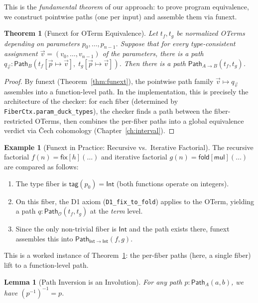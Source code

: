 \documentclass[11pt,a4paper]{report}
\theoremstyle{definition}
\newtheorem{example}[definition]{Example}
\theoremstyle{plain}
\newtheorem{theorem}[definition]{Theorem}
\newtheorem{lemma}[definition]{Lemma}
\newcommand{\Path}{\mathsf{Path}}
\begin{document}
This is the \emph{fundamental theorem} of our approach: to prove
program equivalence, we construct pointwise paths (one per input)
and assemble them via funext.

\begin{theorem}[Funext for OTerm Equivalence]
\label{thm:funext-oterm}
Let $t_f, t_g$ be normalized OTerms depending on parameters
$p_0, \ldots, p_{n-1}$.  Suppose that for every type-consistent
assignment $\vec{v} = (v_0, \ldots, v_{n-1})$ of the parameters, there
is a path
$q_{\vec{v}} : \Path_B(t_f[\vec{p} \mapsto \vec{v}],\;
t_g[\vec{p} \mapsto \vec{v}])$.
Then there is a path $\Path_{A \to B}(t_f, t_g)$.
\end{theorem}

\begin{proof}
By funext (Theorem~\ref{thm:funext}), the pointwise path family
$\vec{v} \mapsto q_{\vec{v}}$ assembles into a function-level path.
In the implementation, this is precisely the architecture of the
checker: for each fiber (determined by \texttt{FiberCtx.param\_duck\_types}),
the checker finds a path between the fiber-restricted OTerms, then
combines the per-fiber paths into a global equivalence verdict via
\v{C}ech cohomology (Chapter~\ref{ch:interval}).
\end{proof}

\begin{example}[Funext in Practice: Recursive vs.\ Iterative Factorial]
\label{ex:funext-factorial}
The recursive factorial $f(n) = \mathsf{fix}[h](\ldots)$ and iterative
factorial $g(n) = \mathsf{fold}[\mathsf{mul}](\ldots)$ are compared as
follows:
\begin{enumerate}
  \item The type fiber is $\mathsf{tag}(p_0) = \mathsf{Int}$ (both
    functions operate on integers).
  \item On this fiber, the D1 axiom (\texttt{D1\_fix\_to\_fold}) applies
    to the OTerm, yielding a path
    $q : \Path_\mathcal{O}(t_f, t_g)$ at the \emph{term} level.
  \item Since the only non-trivial fiber is $\mathsf{Int}$ and the
    path exists there, funext assembles this into
    $\Path_{\mathsf{Int} \to \mathsf{Int}}(f, g)$.
\end{enumerate}
This is a worked instance of Theorem~\ref{thm:funext-oterm}: the
per-fiber paths (here, a single fiber) lift to a function-level path.
\end{example}

\begin{lemma}[Path Inversion is an Involution]
\label{lem:path-inv-invol}
For any path $p : \Path_A(a, b)$, we have $(p^{-1})^{-1} = p$.
\end{lemma}
\end{document}
